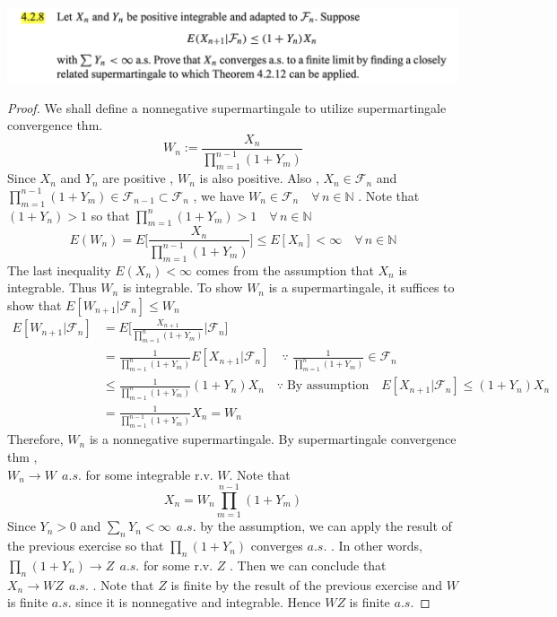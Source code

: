\documentclass[12pt, A4]{article}
\newcommand{\N}{\mathbb{N}}
\newcommand{\F}{\mathcal{F}}
\newcommand{\foranyn}{\quad \forall \, n\in \N}
\begin{document}
\includegraphics[width=17cm]{Exer4.2.8.png}
\begin{proof}
    We shall define a nonnegative supermartingale to utilize supermartingale convergence thm. $$W_n:=\frac{X_n}{\prod_{m=1}^{n-1}(1+Y_m)} $$
    Since $X_n$ and $Y_n$ are positive , $W_n$ is also positive. Also , $X_n\in \F_n$ and $\prod_{m=1}^{n-1}(1+Y_m)\in \F_{n-1}\subset \F_n$ , we have $W_n\in \F_n \foranyn$ . Note that $(1+Y_n)>1$ so that $\prod_{m=1}^n (1+Y_m)>1 \foranyn$ 
    $$E(W_n)= E\Big[\frac{X_n}{\prod_{m=1}^{n-1}(1+Y_m)}\Big]\leq E[X_n]<\infty \foranyn$$ The last inequality $E(X_n)<\infty$ comes from the assumption that $X_n$ is integrable. Thus $W_n$ is integrable. To show $W_n$ is a supermartingale, it suffices to show that $E[W_{n+1}|\F_n]\leq W_n$
    \begin{align*}
        E[W_{n+1}|\F_n] &= E\Big[\frac{X_{n+1}}{\prod_{m=1}^{n}(1+Y_m)}\big|\F_n\Big] \\
        &= \frac{1}{\prod_{m=1}^n(1+Y_m)}E[X_{n+1}|\F_n] \quad \because \; \frac{1}{\prod_{m=1}^n(1+Y_m)}\in \F_n \\ &\leq \frac{1}{\prod_{m=1}^n(1+Y_m)}(1+Y_n)X_n \quad \because \; \text{By assumption}\quad E[X_{n+1}|\F_n]\leq (1+Y_n)X_n \\ 
        &=\frac{1}{\prod_{m=1}^{n-1}(1+Y_m)}X_n = W_n
    \end{align*}
    Therefore, $W_n$ is a nonnegative supermartingale. By supermartingale convergence thm , \\$W_n\rightarrow W\;\,a.s.$ for some integrable r.v. $W$. Note that $$X_n=W_n \prod_{m=1}^{n-1}(1+Y_m)$$ Since $Y_n>0$ and $\sum_n Y_n<\infty\;\,a.s.$ by the assumption, we can apply the result of the previous exercise so that $\prod_n (1+Y_n)$ converges $a.s.$ . In other words,  $\prod_n (1+Y_n)\rightarrow Z\;\,a.s.$ for some r.v. $Z$ . Then we can conclude that $X_n\rightarrow WZ\;\,a.s.$ . Note that $Z$ is finite by the result of the previous exercise and $W$ is finite $a.s.$ since it is nonnegative and integrable. Hence $WZ$ is finite $a.s.$
\end{proof}
\vspace{1cm}
\end{document}
